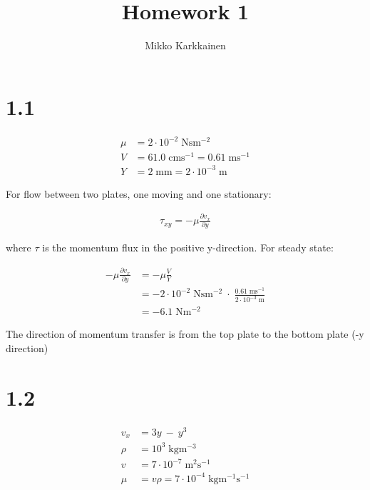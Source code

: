 \documentclass[11pt]{article}
\title{Homework 1}
\author{Mikko Karkkainen}
\begin{document}
    
    
    \maketitle
    
    

    \newcommand{\pder}[2]{\frac{\partial#1}{\partial#2}}
\newcommand{\at}[2]{\left.#1\right|_{#2}}
\newcommand{\eten}[2]{#1 \cdot 10^{#2}}
\newcommand{\unit}[1]{\; \mathrm{#1}}
\newcommand{\mply}[2]{#1 \; \cdot \; #2}
    \section{1.1}\label{section}

    \begin{align}
\mu &= \eten{2}{-2} \unit{Nsm^{-2}} \nonumber \\
V &= 61.0 \unit{cms^{-1}} = 0.61 \unit{m s^{-1}} \nonumber \\
Y &= 2 \unit{mm} = \eten{2}{-3} \unit{m} \nonumber
\end{align}

For flow between two plates, one moving and one stationary:

\begin{align}
\tau_{xy} = -\mu \pder{v_x}{y} 
\end{align}

where \(\tau\) is the momentum flux in the positive y-direction. For
steady state:

\begin{align}
-\mu \pder{v_x}{y} &= - \mu \frac{V}{Y} \\
&= \mply{ \eten{-2}{-2}  \unit{N s m^{-2}} }{ \frac{ 0.61 \; \mathrm{m s^{-1}} }{ \eten{2}{-3} \unit{m} } } \nonumber \\
&= - 6.1 \unit{Nm^{-2}} \nonumber
\end{align}

The direction of momentum transfer is from the top plate to the bottom
plate (-y direction)

    \section{1.2}\label{section}

    \begin{align}
v_x &= 3y \: - \: y^3 \nonumber \\
\rho &= 10^3 \; \mathrm{kgm^{-3}} \nonumber \\
v &= 7 \cdot 10^{-7} \; \mathrm{m^2 s^{-1}} \nonumber \\
\mu &= v \rho = 7 \cdot 10^{-4} \unit{kg m^{-1} s^{-1}} \nonumber
\end{align}
\end{document}
